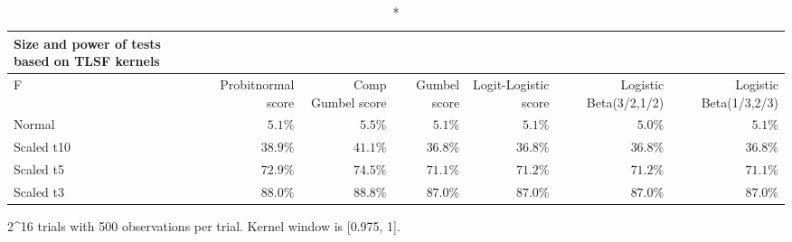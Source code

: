 \setlength{\LTpost}{0mm}
\begin{longtable}{lrrrrrr}
\caption*{
{\large Size and power of tests based on TLSF kernels}
} \\ 
\toprule
F & Probitnormal score & Comp Gumbel score & Gumbel score & Logit-Logistic score & Logistic Beta(3/2,1/2) & Logistic Beta(1/3,2/3) \\ 
\midrule
Normal & $5.1\%$ & $5.5\%$ & $5.1\%$ & $5.1\%$ & $5.0\%$ & $5.1\%$ \\ 
Scaled t10 & $38.9\%$ & $41.1\%$ & $36.8\%$ & $36.8\%$ & $36.8\%$ & $36.8\%$ \\ 
Scaled t5 & $72.9\%$ & $74.5\%$ & $71.1\%$ & $71.2\%$ & $71.2\%$ & $71.1\%$ \\ 
Scaled t3 & $88.0\%$ & $88.8\%$ & $87.0\%$ & $87.0\%$ & $87.0\%$ & $87.0\%$ \\ 
\bottomrule
\end{longtable}
\begin{minipage}{\linewidth}
2\textasciicircum{}16 trials with 500 observations per trial.  Kernel window is [0.975, 1].\\
\end{minipage}


